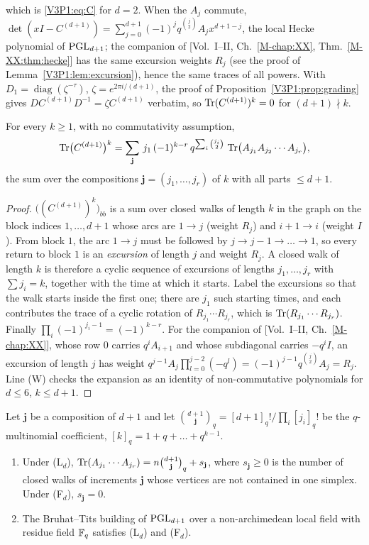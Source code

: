which is \eqref{V3P1:eq:C} for $d=2$. When the $A_j$ commute, $\det(xI-C^{(d+1)})=\sum_{j=0}^{d+1}(-1)^{j}
q^{\binom j2}A_jx^{d+1-j}$, the local Hecke polynomial of $\mathrm{PGL}_{d+1}$; the companion of
[Vol.~I--II, Ch.~\ref{M-chap:XX}, Thm.~\ref{M-XX:thm:hecke}] has the same excursion weights $R_j$
(see the proof of Lemma~\ref{V3P1:lem:excursion}), hence the same traces of all powers. With
$D_1=\operatorname{diag}(\zeta^{-\tau})$, $\zeta=e^{2\pi i/(d+1)}$, the proof of
Proposition~\ref{V3P1:prop:grading} gives $DC^{(d+1)}D^{-1}=\zeta C^{(d+1)}$ verbatim, so
$\operatorname{Tr}(C^{(d+1)})^{k}=0$ for $(d+1)\nmid k$.

\begin{lemma}\label{V3P1:lem:excursion}
For every $k\ge1$, with no commutativity assumption,
\[
\operatorname{Tr}\bigl(C^{(d+1)}\bigr)^{k}=\sum_{\mathbf j}\,j_1\,(-1)^{k-r}\,q^{\sum_i\binom{j_i}2}\,
\operatorname{Tr}\bigl(A_{j_1}A_{j_2}\cdots A_{j_r}\bigr),
\]
the sum over the compositions $\mathbf j=(j_1,\dots,j_r)$ of $k$ with all parts $\le d+1$.
\end{lemma}

\begin{proof}
$\bigl((C^{(d+1)})^{k}\bigr)_{bb}$ is a sum over closed walks of length $k$ in the graph on the block
indices $1,\dots,d+1$ whose arcs are $1\to j$ (weight $R_j$) and $i+1\to i$ (weight $I$). From block
$1$, the arc $1\to j$ must be followed by $j\to j-1\to\dots\to1$, so every return to block $1$ is an
\emph{excursion} of length $j$ and weight $R_j$. A closed walk of length $k$ is therefore a cyclic
sequence of excursions of lengths $j_1,\dots,j_r$ with $\sum j_i=k$, together with the time at which
it starts. Label the excursions so that the walk starts inside the first one; there are $j_1$ such
starting times, and each contributes the trace of a cyclic rotation of $R_{j_1}\cdots R_{j_r}$, which
is $\operatorname{Tr}(R_{j_1}\cdots R_{j_r})$. Finally $\prod_i(-1)^{j_i-1}=(-1)^{k-r}$. For the companion of
[Vol.~I--II, Ch.~\ref{M-chap:XX}], whose row $0$ carries $q^{i}A_{i+1}$ and whose subdiagonal carries
$-q^{i}I$, an excursion of length $j$ has weight
$q^{j-1}A_j\prod_{l=0}^{j-2}(-q^{l})=(-1)^{j-1}q^{\binom j2}A_j=R_j$. Line (W) checks the expansion
as an identity of non-commutative polynomials for $d\le6$, $k\le d+1$.
\end{proof}

\begin{lemma}\label{V3P1:lem:flagwalks}
Let $\mathbf j$ be a composition of $d+1$ and let $\binom{d+1}{\mathbf j}_q=[d+1]_q!/\prod_i[j_i]_q!$ be
the $q$-multinomial coefficient, $[k]_q=1+q+\dots+q^{k-1}$.
\begin{enumerate}
\item[(i)] Under \textup{(L$_d$)}, $\operatorname{Tr}(A_{j_1}\cdots A_{j_r})=n\binom{d+1}{\mathbf j}_q+s_{\mathbf j}$,
where $s_{\mathbf j}\ge0$ is the number of closed walks of increments $\mathbf j$ whose vertices are not
contained in one simplex. Under \textup{(F$_d$)}, $s_{\mathbf j}=0$.
\item[(ii)] The Bruhat--Tits building of $\mathrm{PGL}_{d+1}$ over a non-archimedean local field with
residue field $\mathbb{F}_q$ satisfies \textup{(L$_d$)} and \textup{(F$_d$)}.
\end{enumerate}
\end{lemma}

